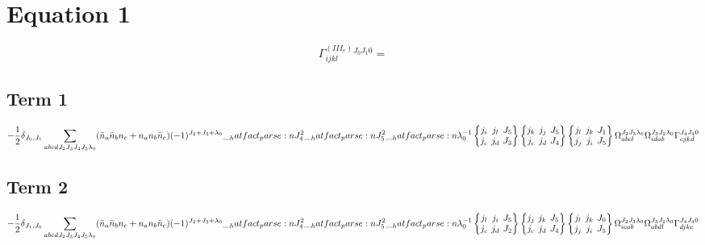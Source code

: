 \documentclass{scrartcl}
\newcommand{\sixj}[6]{\begingroup\setlength{\arraycolsep}{0.2em}\begin{Bmatrix} #1 & #2 & #3 \\ #4 & #5 & #6 \end{Bmatrix}\endgroup}
\begin{document}
\section{Equation 1}
\begin{dmath*}
\Gamma^{(III_c)}_{i j k l}^{{J}_{0} {J}_{1} 0} = 
\end{dmath*}
\subsection{Term 1}
\begin{dmath*}
-\frac{1}{2} \* \delta_{{J}_{0},{J}_{1}} \* \sum_{a b c d {J}_{2} {J}_{3} {J}_{4} {J}_{5} {{\lambda}}_{0}} \* (\bar{n}_{a} \* \bar{n}_{b} \* n_{c} + n_{a} \* n_{b} \* \bar{n}_{c}) \* (-1)^{{J}_{2}+{J}_{3}+{{\lambda}}_{0}} \* \hatfact{{J}_{4}^{2}} \* \hatfact{{J}_{5}^{2}} \* \hatfact{{{\lambda}}_{0}^{-1}} \* \sixj{{j}_{i}}{{j}_{l}}{{J}_{5}}{{j}_{c}}{{j}_{d}}{{J}_{3}} \* \sixj{{j}_{k}}{{j}_{j}}{{J}_{5}}{{j}_{c}}{{j}_{d}}{{J}_{4}} \* \sixj{{j}_{l}}{{j}_{k}}{{J}_{1}}{{j}_{j}}{{j}_{i}}{{J}_{5}} \* \Omega_{a b c l}^{{J}_{2} {J}_{3} {{\lambda}}_{0}} \* \Omega_{i d a b}^{{J}_{3} {J}_{2} {{\lambda}}_{0}} \* \Gamma_{c j k d}^{{J}_{4} {J}_{4} 0}
\end{dmath*}
\subsection{Term 2}
\begin{dmath*}
-\frac{1}{2} \* \delta_{{J}_{1},{J}_{0}} \* \sum_{a b c d {J}_{2} {J}_{3} {J}_{4} {J}_{5} {{\lambda}}_{0}} \* (\bar{n}_{a} \* \bar{n}_{b} \* n_{c} + n_{a} \* n_{b} \* \bar{n}_{c}) \* (-1)^{{J}_{2}+{J}_{3}+{{\lambda}}_{0}} \* \hatfact{{J}_{4}^{2}} \* \hatfact{{J}_{5}^{2}} \* \hatfact{{{\lambda}}_{0}^{-1}} \* \sixj{{j}_{l}}{{j}_{i}}{{J}_{5}}{{j}_{c}}{{j}_{d}}{{J}_{2}} \* \sixj{{j}_{j}}{{j}_{k}}{{J}_{5}}{{j}_{c}}{{j}_{d}}{{J}_{4}} \* \sixj{{j}_{l}}{{j}_{k}}{{J}_{0}}{{j}_{j}}{{j}_{i}}{{J}_{5}} \* \Omega_{i c a b}^{{J}_{2} {J}_{3} {{\lambda}}_{0}} \* \Omega_{a b d l}^{{J}_{3} {J}_{2} {{\lambda}}_{0}} \* \Gamma_{d j k c}^{{J}_{4} {J}_{4} 0}
\end{dmath*}
\end{document}

